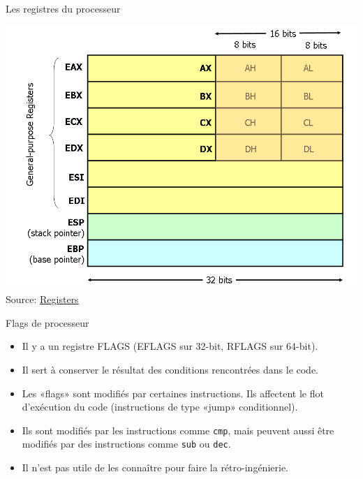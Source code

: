 \documentclass[10pt,xcolor={table,dvipsnames},t]{beamer}
\begin{document}
\begin{frame}{Les registres du processeur}

    \begin{center}
    \includegraphics[width=.60\textwidth,height=.60\textheight]{x86-registers}\newline{}
    Source: \href{https://www.cs.virginia.edu/~evans/cs216/guides/x86.html}{Registers}
    \end{center}
\end{frame}

\begin{frame}{Flags de processeur}
    \begin{itemize}
        \item Il y a un registre FLAGS (EFLAGS sur 32-bit, RFLAGS sur 64-bit). 
        \item Il sert à conserver le résultat des conditions rencontrées dans le code.
        \item Les «flags» sont modifiés par certaines instructions. Ils affectent le flot d'exécution du code (instructions de type «jump» conditionnel).
        \item Ils sont modifiés par les instructions comme \texttt{cmp}, mais peuvent aussi être modifiés par des instructions comme \texttt{sub} ou \texttt{dec}. 
        \item Il n'est pas utile de les connaître pour faire la rétro-ingénierie.
    \end{itemize}
\end{frame}
\end{document}
